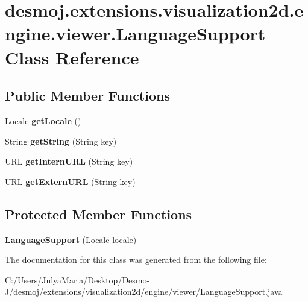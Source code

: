 \section{desmoj.\-extensions.\-visualization2d.\-engine.\-viewer.\-Language\-Support Class Reference}
\label{classdesmoj_1_1extensions_1_1visualization2d_1_1engine_1_1viewer_1_1_language_support}
\subsection*{Public Member Functions}
\begin{DoxyCompactItemize}
\item 
Locale {\bfseries get\-Locale} ()\label{classdesmoj_1_1extensions_1_1visualization2d_1_1engine_1_1viewer_1_1_language_support_a556136480be2c874056607b1e867d896}

\item 
String {\bfseries get\-String} (String key)\label{classdesmoj_1_1extensions_1_1visualization2d_1_1engine_1_1viewer_1_1_language_support_a6bd63b05b50b8d29213bbe2a5d18edfb}

\item 
U\-R\-L {\bfseries get\-Intern\-U\-R\-L} (String key)\label{classdesmoj_1_1extensions_1_1visualization2d_1_1engine_1_1viewer_1_1_language_support_a4885a4059435f1fac84cdeb2fa151b02}

\item 
U\-R\-L {\bfseries get\-Extern\-U\-R\-L} (String key)\label{classdesmoj_1_1extensions_1_1visualization2d_1_1engine_1_1viewer_1_1_language_support_a3f7e132cdd4d80e4fc24a5d84d069c2c}

\end{DoxyCompactItemize}
\subsection*{Protected Member Functions}
\begin{DoxyCompactItemize}
\item 
{\bfseries Language\-Support} (Locale locale)\label{classdesmoj_1_1extensions_1_1visualization2d_1_1engine_1_1viewer_1_1_language_support_af977dda36e40ef2b634de840ae24cd95}

\end{DoxyCompactItemize}


The documentation for this class was generated from the following file\-:\begin{DoxyCompactItemize}
\item 
C\-:/\-Users/\-Julya\-Maria/\-Desktop/\-Desmo-\/\-J/desmoj/extensions/visualization2d/engine/viewer/Language\-Support.\-java\end{DoxyCompactItemize}
